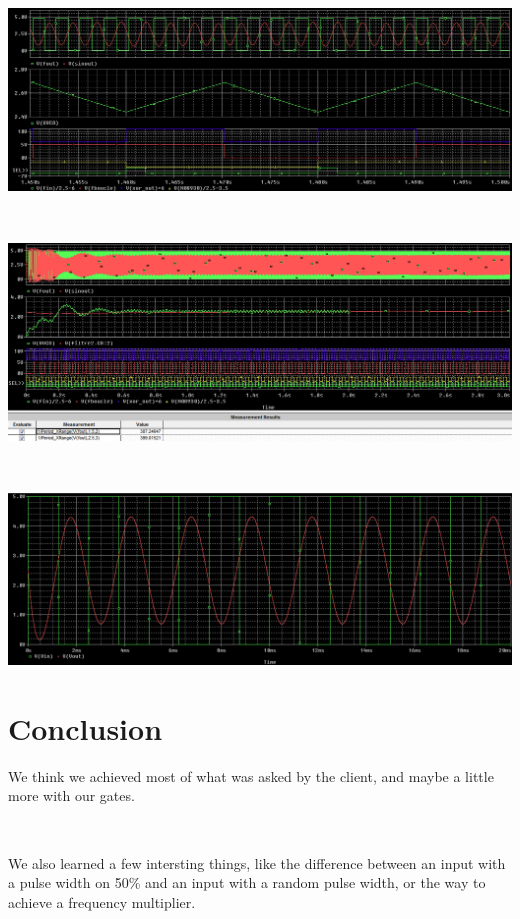 \documentclass{article}
\begin{document}
~

\includegraphics[width=15cm]{pll_2_zoom2.png}

~

\includegraphics[width=15cm]{pll_3_zoom_full.png}

~

\includegraphics[width=15cm]{trans_filtre_sortie.png}

\section*{Conclusion}

We think we achieved most of what was asked by the client, and maybe a little more with our gates.

~

We also learned a few intersting things, like the difference between an input with a pulse width on 50\% and an input with a random pulse width, or the way to achieve a frequency multiplier.
\end{document}
